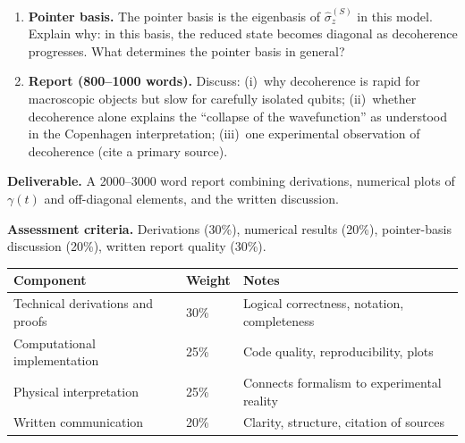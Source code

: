 \documentclass[11pt,a4paper]{article}
\begin{document}
\begin{tcolorbox}[ugprobbox, title={Project CJ2 --- Decoherence and the Pointer Basis}]
\begin{enumerate}[leftmargin=1.8em, label=\textbf{\arabic*.}, itemsep=8pt]
  \item \textbf{Pointer basis.}
        The pointer basis is the eigenbasis of $\hat{\sigma}_z^{(S)}$ in this model.
        Explain why: in this basis, the reduced state becomes diagonal as
        decoherence progresses. What determines the pointer basis in general?

  \item \textbf{Report (800--1000 words).}
        Discuss: (i)~why decoherence is rapid for macroscopic objects but slow for
        carefully isolated qubits; (ii)~whether decoherence alone explains the
        ``collapse of the wavefunction'' as understood in the Copenhagen interpretation;
        (iii)~one experimental observation of decoherence (cite a primary source).
\end{enumerate}

\medskip\textbf{Deliverable.}
A 2000--3000 word report combining derivations, numerical plots of $\gamma(t)$
and off-diagonal elements, and the written discussion.

\medskip\textbf{Assessment criteria.}
Derivations (30\%), numerical results (20\%),
pointer-basis discussion (20\%), written report quality (30\%).
\end{tcolorbox}

\bigskip
\begin{tcolorbox}[rubricbox, title={CPJU Global Rubric}]
\begin{tabular}{lll}
\toprule
Component & Weight & Notes\\
\midrule
Technical derivations and proofs & 30\% & Logical correctness, notation, completeness\\
Computational implementation     & 25\% & Code quality, reproducibility, plots\\
Physical interpretation          & 25\% & Connects formalism to experimental reality\\
Written communication            & 20\% & Clarity, structure, citation of sources\\
\bottomrule
\end{tabular}
\end{tcolorbox}
\end{document}
